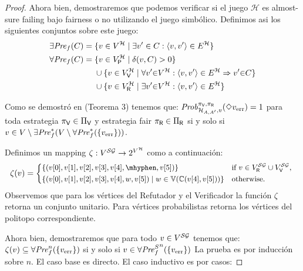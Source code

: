 \begin{proof}
Ahora bien, demostraremos que podemos verificar si el juego $\mathcal{H}$ es almost-sure failing bajo fairness o no utilizando el juego simbólico. Definimos asi los siguientes conjuntos sobre este juego:
\begin{align*}
  \exists\mathit{Pre}_f(C) = {}&\{ v \in V^{\mathcal{H}} \mid\exists v' \in C : \langle v,v' \rangle \in E^\mathcal{H} \} \\
  \forall\mathit{Pre}_f(C) = {}&\{ v \in V^{\mathcal{H}}_{\mathsf{P}} \mid \delta(v,C)>0\} \\
                       & \cup \{ v \in  V^{\mathcal{H}}_{\mathsf{V}} \mid \forall v' {\in} V^{\mathcal{H}} : \langle v,v' \rangle \in E^{\mathcal{H}} \Rightarrow v' {\in} C \} \\
                     & \cup \{v \in V^{\mathcal{H}}_{\mathsf{R}} \mid \exists v'{\in} V^{\mathcal{H}} : \langle v,v' \rangle \in E^\mathcal{H} \} 
\end{align*}

Como se demostró en \cite{CastroDDP22} (Teorema 3) tenemos que: 
 $\mathit{Prob}^{\pi_{\mathsf{V}}, \pi_{\mathsf{R}}}_{\mathcal{H}_{A,A'},v}(\Diamond v_{\text{err}}) = 1$ para toda estrategia 
 $\pi_{\mathsf{V}} \in \Pi_{\mathsf{V}}$ y estrategia fair $\pi_{\mathsf{R}} \in \Pi_{\mathsf{R}}$
  si y solo si $v \in V\setminus \exists\mathit{Pre}_f^*(V \setminus \forall\mathit{Pre}_f^*(\{ v_{\text{err}} \}))$.
    
 Definimos un mapping $\zeta : V^{\mathcal{SG}} \rightarrow 2^{V^{\mathcal{H}}}$ como a continuación:
 \[\small
     \zeta(v) = 
                    \begin{cases*}
                         \{(\pr{0}{v},\pr{1}{v},\pr{2}{v},\pr{3}{v},\pr{4}{v},\mhyphen, \pr{5}{v} )\} & if  $v \in V^{\SymbG}_\Refuter \cup V^{\SymbG}_\Verifier$, \\
                         \{ (\pr{0}{v},\pr{1}{v},\pr{2}{v},\pr{3}{v},\pr{4}{v},w, \pr{5}{v}) \mid w \in \vertices{\couplings{\pr{4}{v}}{\pr{5}{v}}}\} & otherwise.
                    \end{cases*}
 \]   
 Observemos que para los vértices del Refutador y el Verificador la función $\zeta$ retorna un conjunto unitario.  Para vértices probabilistas retorna los vértices del politopo correspondiente.
 
  Ahora bien, demostraremos que para todo $v \in V^{\mathcal{SG}}$  tenemos que:  $\zeta(v) \subseteq  \forall\mathit{Pre}_f^n(\{ v_{\text{err}} \})$ si y solo si $v \in {\forall\mathit{Pre}^S_f}^n(\{ v_{\text{err}} \})$
  La prueba es por inducción sobre $n$. El caso base es directo. El caso inductivo es por casos:
 

\end{proof}
